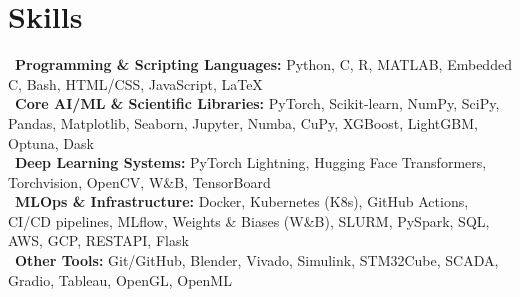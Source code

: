\section*{Skills}
\textbullet~\textbf{Programming \& Scripting Languages:} Python, C, R, MATLAB, Embedded C, Bash, HTML/CSS, JavaScript, \LaTeX \\[0.25em]
\textbullet~\textbf{Core AI/ML \& Scientific Libraries:} PyTorch, Scikit-learn, NumPy, SciPy, Pandas, Matplotlib, Seaborn, Jupyter, Numba, CuPy, XGBoost, LightGBM, Optuna, Dask \\[0.25em]
\textbullet~\textbf{Deep Learning Systems:} PyTorch Lightning, Hugging Face Transformers, Torchvision, OpenCV, W\&B, TensorBoard \\[0.25em]
\textbullet~\textbf{MLOps \& Infrastructure:} Docker, Kubernetes (K8s), GitHub Actions, CI/CD pipelines, MLflow, Weights \& Biases (W\&B), SLURM, PySpark, SQL, AWS, GCP, RESTAPI, Flask \\[0.25em]
\textbullet~\textbf{Other Tools:} Git/GitHub, Blender, Vivado, Simulink, STM32Cube, SCADA, Gradio, Tableau, OpenGL, OpenML